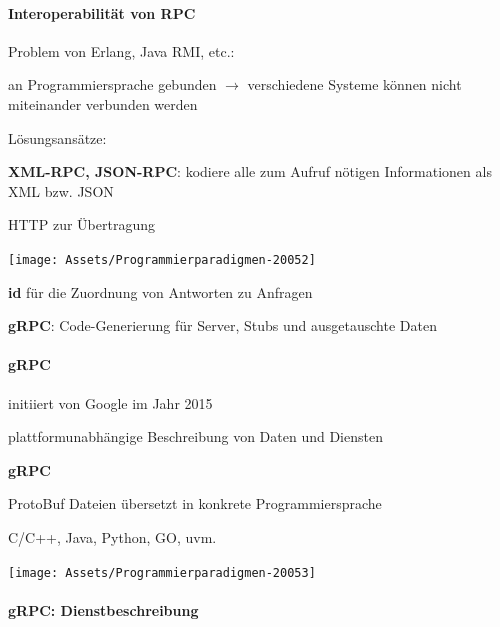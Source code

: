 \documentclass[10pt]{article}
\begin{document}
\paragraph{Interoperabilität von RPC}

Problem von Erlang, Java RMI, etc.: 
\begin{itemize*}
  \item an Programmiersprache gebunden $\rightarrow$ verschiedene Systeme können nicht miteinander verbunden werden
\end{itemize*}
Lösungsansätze: 
\begin{itemize*}
  \item \textbf{XML-RPC, JSON-RPC}: kodiere alle zum Aufruf nötigen Informationen als XML bzw. JSON
  \begin{itemize*}
    \item HTTP zur Übertragung
    \item 	\texttt{[image: Assets/Programmierparadigmen-20052]}
    \item \textbf{id} für die Zuordnung von Antworten zu Anfragen
  \end{itemize*}
  \item \textbf{gRPC}: Code-Generierung für Server, Stubs und ausgetauschte Daten
\end{itemize*}

\paragraph{gRPC}

\begin{itemize*}
  \item initiiert von Google im Jahr 2015
  \item plattformunabhängige Beschreibung von Daten und Diensten
\end{itemize*}
\color{orange} \textbf{gRPC} \color{black}
\begin{itemize*}
  \item ProtoBuf Dateien übersetzt in konkrete Programmiersprache
  \item C/C++, Java, Python, GO, uvm.
\end{itemize*}
\begin{center}
  \centering
  \texttt{[image: Assets/Programmierparadigmen-20053]}
\end{center}

\paragraph{gRPC: Dienstbeschreibung}
\end{document}
